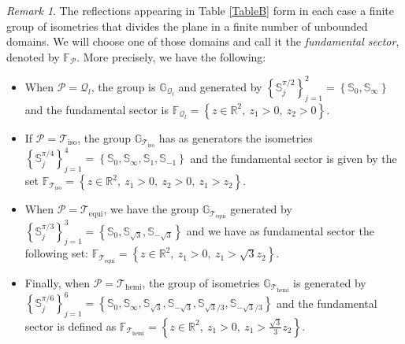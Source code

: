 \documentclass{amsart}
\theoremstyle{definition}
\theoremstyle{remark}
\newtheorem{remark}[theorem]{Remark}
\numberwithin{equation}{section}
\theoremstyle{definition}
\theoremstyle{remark}
\begin{document}
\begin{remark}\label{nod}
  The  reflections appearing in Table \ref{TableB} form in each case a finite group of isometries that divides the plane in a finite number of unbounded domains. We will choose one of those domains and call it the \emph{fundamental sector}, denoted by $\mathbb{F}_\mathcal{P}$. More precisely, we have the following:\begin{itemize}
      \item When $\mathcal{P}=\mathcal{Q}_l$, the group is $\mathbb{G}_{\mathcal{Q}_l}$ and generated by $\left\{\mathbb{S}_j^{\pi/2}\right\}_{j=1}^2=\left\{\mathbb{S}_0,\mathbb{S}_\infty\right\}$ and the fundamental sector is $\mathbb{F}_{\mathcal{Q}_l}=\left\{z\in\mathbb{R}^2,\ z_1>0,\ z_2>0\right\}$.
      \item If $\mathcal{P}=\mathcal{T}_{\mathrm{iso}}$, the group $\mathbb{G}_{\mathcal{T}_{\mathrm{iso}}}$ has as generators the isometries $\left\{\mathbb{S}_j^{\pi/4}\right\}_{j=1}^4=\left\{\mathbb{S}_0,\mathbb{S}_\infty,\mathbb{S}_1,\mathbb{S}_{-1}\right\}$ and the fundamental sector is given by the set $\mathbb{F}_{\mathcal{T}_{\mathrm{iso}}}=\left\{z\in\mathbb{R}^2,\ z_1>0,\ z_2>0,\ z_1>z_2\right\}$.
      \item When $\mathcal{P}=\mathcal{T}_{\mathrm{equi}}$, we have the group $\mathbb{G}_{\mathcal{T}_{\mathrm{equi}}}$  generated by $\left\{\mathbb{S}_j^{\pi/3}\right\}_{j=1}^3=\left\{\mathbb{S}_0,\mathbb{S}_{\sqrt{3}},\mathbb{S}_{-\sqrt{3}}\right\}$ and we have as fundamental sector the following set: $\mathbb{F}_{\mathcal{T}_{\mathrm{equi}}}=\left\{z\in\mathbb{R}^2,\ z_1>0,\ z_1>\sqrt{3}z_2\right\}$.
      \item Finally, when $\mathcal{P}=\mathcal{T}_{\mathrm{hemi}}$, the group of isometries $\mathbb{G}_{\mathcal{T}_{\mathrm{hemi}}}$  is generated by $\left\{\mathbb{S}_j^{\pi/6}\right\}_{j=1}^6=\left\{\mathbb{S}_0,\mathbb{S}_\infty,\mathbb{S}_{\sqrt{3}},\mathbb{S}_{-\sqrt{3}},\mathbb{S}_{\sqrt{3}/3},\mathbb{S}_{-\sqrt{3}/3}\right\}$ and the fundamental sector is defined as  $\mathbb{F}_{\mathcal{T}_{\mathrm{hemi}}}=\left\{z\in\mathbb{R}^2,\ z_1>0,\ z_1>\frac{\sqrt{3}}{3}z_2\right\}$.
      \end{itemize}
\end{remark}
\end{document}

